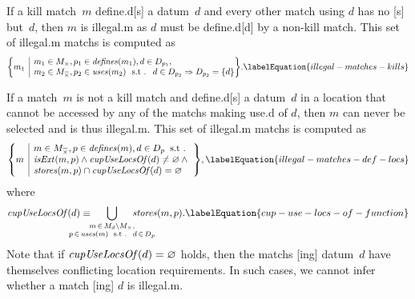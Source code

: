 If a \gls{kill match}~$m$ \gls{define.d}[s] a \gls{datum}~$d$ and every other
\gls{match} using $d$ has no [s] but~$d$, then $m$
is \gls{illegal.m} as $d$ must be \gls{define.d}[d] by a non-\gls{kill match}.
%
This set of \gls{illegal.m} \glspl{match} is computed as
%
\begin{equation}
  \mSetBuilder*{m_1}%
               {%
                 \begin{array}{@{}l@{}}
                   m_1 \in \mKillMatchSet,
                   p_1 \in \mDefines(m_1),
                   d \in \mDataSet[p_1], \\
                   m_2 \in \mKillMatchCompSet,
                   p_2 \in \mUses(m_2) \text{ \st }
                   d \in \mDataSet[p_2] \mImp \mDataSet[p_2] = \mSet{d}
                 \end{array}
               }\!.
  \labelEquation{illegal-matches-kills}
\end{equation}

If a \gls{match}~$m$ is not a \gls{kill match} and \gls{define.d}[s] a
\gls{datum}~$d$ in a \gls{location} that cannot be accessed by any of the
\glspl{match} making \gls{use.d} of $d$, then $m$ can never be selected and is
thus \gls{illegal.m}.
%
This set of \gls{illegal.m} \glspl{match} is computed as
%
\begin{equation}
  \mSetBuilder*{m}%
               {%
                 \begin{array}{@{}l@{}}
                   m \in \mKillMatchCompSet,
                   p \in \mDefines(m),
                   d \in \mDataSet[p] \hspace{-1pt} \text{ \st} \\
                   \mIsExt(m, p)
                   \mAnd
                   \mCupUseLocsOf(d) \neq \mEmptySet
                   \mAnd \mbox{} \\
                   \mStores(m, p) \cap \mCupUseLocsOf(d) = \mEmptySet
                 \end{array}
               }\!,
  \labelEquation{illegal-matches-def-locs}
\end{equation}
%
where
%
\begin{equation}
  \mCupUseLocsOf(d)
  \equiv
  \hspace{-2.5em}
  \bigcup_{
    \substack{
      m \, \in \, \mMatchSet[d] \setminus \mKillMatchSet, \\
      p \, \in \, \mUses(m)
      \text{ \st } d \, \in \, \mDataSet[p]
    }
  }
    \hspace{-2.5em}
    \mStores(m, p).
  \labelEquation{cup-use-locs-of-function}
\end{equation}
%
Note that if \mbox{$\operatorname{\textrm{\textit{cupUseLocsOf}}}(d) = \varnothing$} holds, then the
\glspl{match} [ing] \gls{datum}~$d$ have themselves conflicting
\gls{location} requirements.
%
In such cases, we cannot infer whether a \gls{match} [ing]
$d$ is \gls{illegal.m}.

